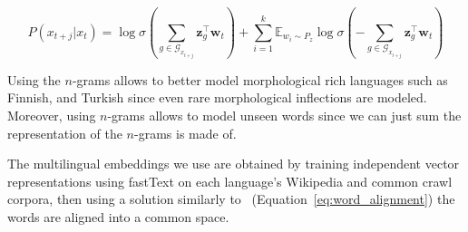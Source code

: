 \begin{equation}
P\left(x_{t+j} | x_{t}\right)=\log \sigma\left( \sum_{g \in \mathcal{G}_{x_{t+j}}} \mathbf{z}_{g}^{\top} \mathbf{w}_{t}\right)+\sum_{i=1}^{k} \mathbb{E}_{w_{i} \sim P_{z}} \log \sigma\left(- \sum_{g \in \mathcal{G}_{x_{t+j}}} \mathbf{z}_{g}^{\top}\mathbf{w}_{t}\right)
\end{equation}

Using the $n$-grams allows to better model morphological rich languages such as Finnish, and Turkish since even rare morphological inflections are modeled. Moreover, using $n$-grams allows to model unseen words since we can just sum the representation of the $n$-grams is made of. 

The multilingual embeddings we use are obtained by training independent vector representations using fastText on each language's Wikipedia and common crawl corpora, then using a solution similarly to~\citep{mikolov2013exploiting} (Equation~\ref{eq:word_alignment}) the words are aligned into a common space. 



